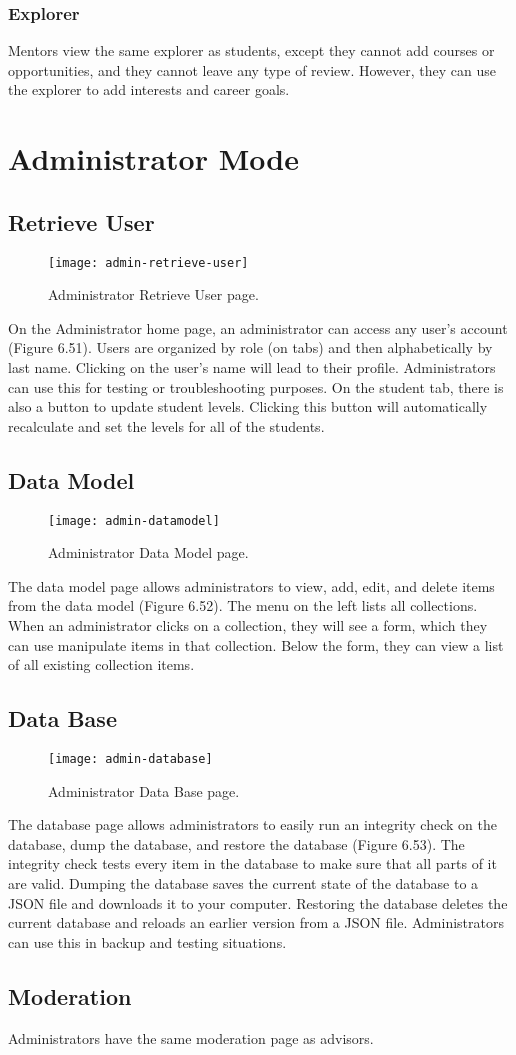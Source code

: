 \subsubsection{Explorer}
Mentors view the same explorer as students, except they cannot add courses or opportunities, and they cannot leave any type of review. However, they can use the explorer to add interests and career goals.

\section{Administrator Mode}
\subsection{Retrieve User}
\begin{figure}[htbp!]
\centering
\texttt{[image: admin-retrieve-user]}
\caption{Administrator Retrieve User page.}
\end{figure}
On the Administrator home page, an administrator can access any user's account (Figure 6.51). Users are organized by role (on tabs) and then alphabetically by last name. Clicking on the user's name will lead to their profile. Administrators can use this for testing or troubleshooting purposes. On the student tab, there is also a button to update student levels. Clicking this button will automatically recalculate and set the levels for all of the students.

\subsection{Data Model}
\begin{figure}[htbp!]
\centering
\texttt{[image: admin-datamodel]}
\caption{Administrator Data Model page.}
\end{figure}
The data model page allows administrators to view, add, edit, and delete items from the data model (Figure 6.52). The menu on the left lists all collections. When an administrator clicks on a collection, they will see a form, which they can use manipulate items in that collection. Below the form, they can view a list of all existing collection items. 
\subsection{Data Base}
\begin{figure}[htbp!]
\centering
\texttt{[image: admin-database]}
\caption{Administrator Data Base page.}
\end{figure}
The database page allows administrators to easily run an integrity check on the database, dump the database, and restore the database (Figure 6.53). The integrity check tests every item in the database to make sure that all parts of it are valid. Dumping the database saves the current state of the database to a JSON file and downloads it to your computer. Restoring the database deletes the current database and reloads an earlier version from a JSON file. Administrators can use this in backup and testing situations.
\subsection{Moderation}
Administrators have the same moderation page as advisors. 